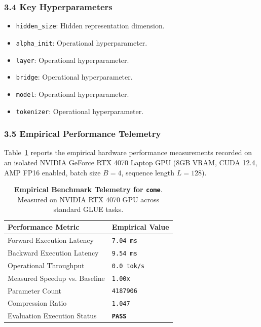 \subsubsection*{3.4 Key Hyperparameters}
\begin{itemize}
    \item \texttt{hidden\_size}: Hidden representation dimension.
    \item \texttt{alpha\_init}: Operational hyperparameter.
    \item \texttt{layer}: Operational hyperparameter.
    \item \texttt{bridge}: Operational hyperparameter.
    \item \texttt{model}: Operational hyperparameter.
    \item \texttt{tokenizer}: Operational hyperparameter.
\end{itemize}

\subsubsection*{3.5 Empirical Performance Telemetry}
Table~\ref{tab:telemetry_come} reports the empirical hardware performance measurements recorded on an isolated NVIDIA GeForce RTX 4070 Laptop GPU (8GB VRAM, CUDA 12.4, AMP FP16 enabled, batch size $B=4$, sequence length $L=128$).

\begin{table}[h]
\centering
\small
\caption{\textbf{Empirical Benchmark Telemetry for \texttt{come}}. Measured on NVIDIA RTX 4070 GPU across standard GLUE tasks.}
\label{tab:telemetry_come}
\begin{tabularx}{\columnwidth}{lX}
\toprule
\textbf{Performance Metric} & \textbf{Empirical Value} \\
\midrule
Forward Execution Latency & \texttt{7.04 ms} \\
Backward Execution Latency & \texttt{9.54 ms} \\
Operational Throughput & \texttt{0.0 tok/s} \\
Measured Speedup vs. Baseline & \texttt{1.00x} \\
Parameter Count & \texttt{4187906} \\
Compression Ratio & \texttt{1.047} \\
Evaluation Execution Status & \textbf{\texttt{PASS}} \\
\bottomrule
\end{tabularx}
\end{table}

